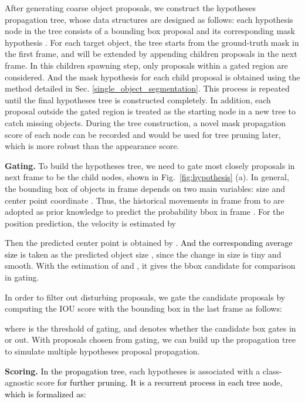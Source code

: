 \documentclass[10pt,twocolumn,letterpaper]{article}
\newcommand{\ldz}[1]{\textcolor{black}{#1}}
\begin{document}
After generating coarse object proposals, we construct the hypotheses propagation tree, whose data structures are designed as follows: each hypothesis node in the tree consists of a bounding box proposal  and its corresponding mask hypothesis . 
For each target object, the tree starts from the ground-truth mask in the first frame, and will be extended by appending children proposals in the next frame. 
In this children spawning step, only proposals within a gated region are considered. 
And the mask hypothesis  for each child proposal  is obtained using the method detailed in Sec. \ref{single_object_segmentation}. 
This process is repeated until the final hypotheses tree is constructed completely. 
In addition, each proposal outside the gated region is treated as the starting node in a new tree to catch missing objects. 
During the tree construction, a novel mask propagation score of each node can be recorded and would be used for tree pruning later, which is more robust than the appearance score. 



\textbf{Gating.} To build the hypotheses tree, we need to gate most closely proposals in next frame to be the child nodes, shown in Fig.~\ref{fig:hypothesis} (a). 
In general, the bounding box of objects in frame  depends on two main variables: size  and center point coordinate . Thus, the historical movements in  frame from  to  are adopted as prior knowledge to predict the probability bbox in frame . For the position prediction, the velocity  is estimated by 

Then the predicted center point is obtained by .
\ldz{And the corresponding average size} is taken as the predicted object size , since the change in size is tiny and smooth. With the estimation of  and , it gives the bbox candidate  for comparison in gating.

In order to filter out disturbing proposals, we gate the candidate proposals by computing the IOU score with the bounding box  in the last frame as follows:

where  is the threshold of gating, and  denotes whether the candidate box  gates in or out. With proposals chosen from gating, we can build up the propagation tree to simulate multiple hypotheses proposal propagation.


\textbf{Scoring.} 
\ldz{In the propagation tree}, each hypotheses is associated with a class-agnostic score \ldz{for further pruning. It is a recurrent process in each tree node, which is formalized as:}
\end{document}
